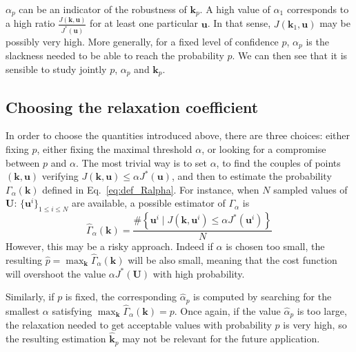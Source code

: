 \documentclass[preprint, 1p]{elsarticle}
\newcommand{\checkap}{{\alpha}_p}
\newcommand{\checka}{{\alpha}}
\newcommand{\checkk}{\mathbf{k}}
\newcommand{\checkkp}{{\mathbf{k}}_p}
\newcommand{\victor}[1]{{\itshape\color{green} ({#1})}}
\begin{document}
$\checkap$ can be an indicator of the robustness of $\checkkp$.  
A high value of $\checka_1$ corresponds to a high ratio $\frac{J(\mathbf{k},\mathbf{u})}{J^*(\mathbf{u})}$ for at least one particular $\mathbf{u}$. In that sense, $J(\checkk_1,\mathbf{u})$ may be possibly very high.
More generally, for a fixed level of confidence $p$, $\checkap$ is the slackness needed to be able to reach the probability $p$. %
We can then see that it is sensible to study jointly $p$, $\checkap$ and $\checkkp$.


\subsection{Choosing the relaxation coefficient}%
\label{ssec:balance}

In order to choose the quantities introduced above, there are three choices: either fixing $p$, either fixing the maximal threshold $\alpha$, or looking for a compromise between $p$ and $\alpha$.
The most trivial way is to set $\alpha$, to find the couples of points $(\mathbf{k},\mathbf{u})$ verifying $J(\mathbf{k},\mathbf{u}) \leq \alpha J^*(\mathbf{u})$, and then to estimate the probability $\Gamma_{\alpha}(\mathbf{k})$ defined in Eq.~\eqref{eq:def_Ralpha}.
For instance, when $N$ sampled values of $\mathbf{U}$: $\{\mathbf{u}^i\}_{1\leq i \leq N}$ are available, a possible estimator of $\Gamma_{\alpha}$ is
\begin{equation}
\hat{\Gamma}_{\alpha}(\mathbf{k}) = \frac{\# \left\{\mathbf{u}^i \mid J(\mathbf{k},\mathbf{u}^i) \leq \alpha J^*(\mathbf{u}^i)\right\}}{N}
\end{equation}
However, this may be a risky approach. Indeed if $\alpha$ is chosen too small, the resulting $\hat{p}=\max_{\mathbf{k}} \hat{\Gamma}_{\alpha}(\mathbf{k})$ will be also small, meaning that the cost function will overshoot the value $\alpha J^*(\mathbf{U})$ with high probability.

Similarly, if $p$ is fixed, the corresponding $\hat{\checka}_p$ is computed by searching for the smallest $\alpha$ satisfying $\max_{\mathbf{k}} \hat{\Gamma}_{\alpha}(\mathbf{k})=p$. Once again, if the value $\hat{\checka}_p$ is too large, the relaxation needed to get acceptable values with probability $p$ is very high, so the resulting estimation $\hat{\checkk}_p$ may not be relevant for the future application.
\end{document}

